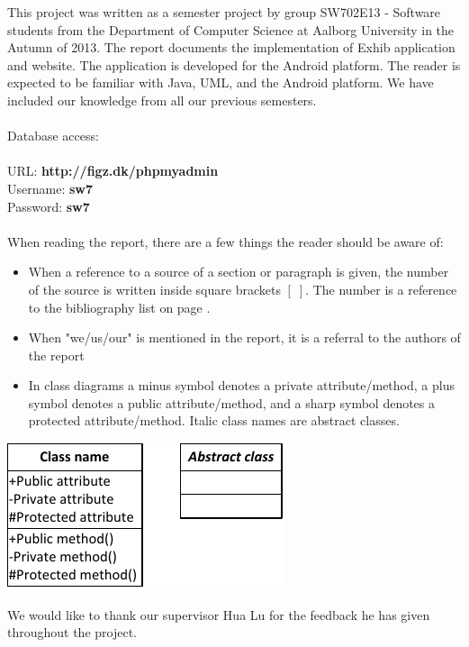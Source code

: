 This project was written as a semester project by group SW702E13 - Software students from the Department of Computer Science at Aalborg University in the Autumn of 2013. The report documents the implementation of Exhib application and website. The application is developed for the Android platform. The reader is expected to be familiar with Java, UML, and the Android platform. We have included our knowledge from all our previous semesters.
\\\\
Database access:\\\\
URL: \textbf{http://figz.dk/phpmyadmin}\\
Username: \textbf{sw7}\\
Password: \textbf{sw7}\\\\
When reading the report, there are a few things the reader should be aware of:
\begin{itemize}
\item When a reference to a source of a section or paragraph is given, the number of the source is written inside square brackets $[\;]$. The number is a reference to the bibliography list on page \pageref{chap:bib}.
\item When "we/us/our" is mentioned in the report, it is a referral to the authors of the report
\item In class diagrams a minus symbol denotes a private attribute/method, a plus symbol denotes a public attribute/method, and a sharp symbol denotes a protected attribute/method. Italic class names are abstract classes.
\end{itemize}
\begin{center}
\includegraphics[width=0.35\linewidth]{img/umltheory.pdf}
\end{center}
We would like to thank our supervisor Hua Lu for the feedback he has given throughout the project.